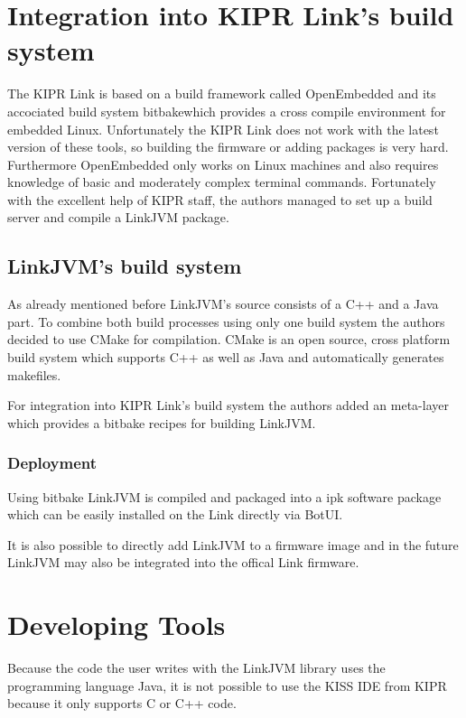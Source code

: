 \documentclass{juniorjournal}
\begin{document}
\section{Integration into KIPR Link's build system}
The KIPR\cite{KIPR} Link\cite{link} is based on a build framework called \frqq OpenEmbedded\flqq\cite{openembedded} and its accociated build system \frqq bitbake\flqq  which provides a cross compile environment for embedded Linux\cite{Look_Inside_Kipr_Link}.
Unfortunately the KIPR\cite{KIPR} Link\cite{link} does not work with the latest version of these tools, so building the firmware or adding packages is very hard.
Furthermore OpenEmbedded\cite{openembedded} only works on Linux machines and also requires knowledge of basic and moderately complex terminal commands.
Fortunately with the excellent help of KIPR staff, the authors managed to set up a build server and compile a LinkJVM package.

\subsection{LinkJVM's build system}
As already mentioned before LinkJVM's source consists of a C++ and a Java\cite{Java} part.
To combine both build processes using only one build system the authors decided to use CMake for compilation.
CMake is an open source, cross platform build system which supports C++ as well as Java\cite{Java} and automatically generates makefiles.

For integration into KIPR\cite{KIPR} Link's\cite{link} build system the authors added an meta-layer which provides a bitbake recipes for building LinkJVM.

\subsubsection{Deployment}
Using bitbake LinkJVM is compiled and packaged into a ipk software package which can be easily installed on the Link\cite{link} directly via BotUI.

It is also possible to directly add LinkJVM to a firmware image and in the future LinkJVM may also be integrated into the offical Link\cite{link} firmware.
\section{Developing Tools}
\label{sec:developing-tools}
Because the code the user writes with the LinkJVM library uses the programming
language Java\cite{Java}, it is not possible to use the KISS IDE from KIPR\cite{KIPR} because it only
supports C or C++ code.
\end{document}
